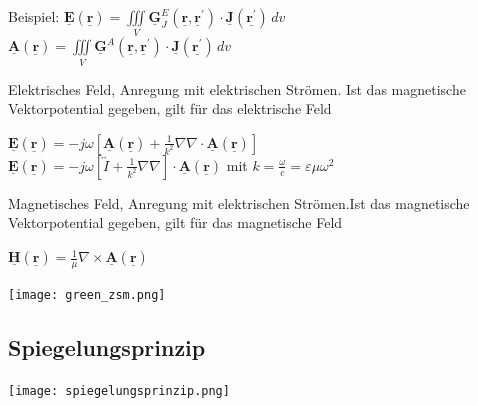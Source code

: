 \documentclass[english]{latex4ei/latex4ei_sheet}
\renewcommand{\vec}[1]{\underline{\boldsymbol{#1}}}
\begin{document}
\begin{sectionbox}
    Beispiel: $\vec{E}\left(\vec{r}\right) = \iiint\limits_{V}\vec{G}_{J}^{E}\left(\vec{r}, \vec{r}^{\prime}\right) \cdot \vec{J}\left(\vec{r^{\prime}}\right)\,dv $\\
    $\vec{A}\left(\vec{r}\right) = \iiint\limits_{V}\vec{G}^{A}\left(\vec{r}, \vec{r}^{\prime}\right) \cdot \vec{J}\left(\vec{r^{\prime}}\right)\,dv $

    Elektrisches Feld, Anregung mit elektrischen Strömen. Ist das magnetische Vektorpotential gegeben, gilt für das elektrische Feld\\
    \begin{emphbox}
        $\vec{E}(\vec{r})=-j \omega\left[\vec{A}(\vec{r})+\frac{1}{k^{2}} \nabla \nabla \cdot \vec{A}(\vec{r})\right]$\\
        $\vec{E}(\vec{r})=-j \omega\left[\overleftrightarrow{I}+\frac{1}{k^{2}} \nabla \nabla\right] \cdot \vec{A}(\vec{r})$
        mit $k=\frac{\omega}{c}=\varepsilon\mu\omega^2$\\
    \end{emphbox}
    Magnetisches Feld, Anregung mit elektrischen Strömen.Ist das magnetische Vektorpotential gegeben, gilt für das magnetische Feld\\
    \begin{emphbox}
        $\vec{H}(\vec{r})=\frac{1}{\mu} \nabla \times \vec{A}(\vec{r})$\\
    \end{emphbox}
    \begin{center}\texttt{[image: green\_zsm.png]}\end{center}
\end{sectionbox}

\begin{sectionbox}
    \subsection{Spiegelungsprinzip}
    \begin{center}\texttt{[image: spiegelungsprinzip.png]}\end{center}
\end{sectionbox}
\end{document}
